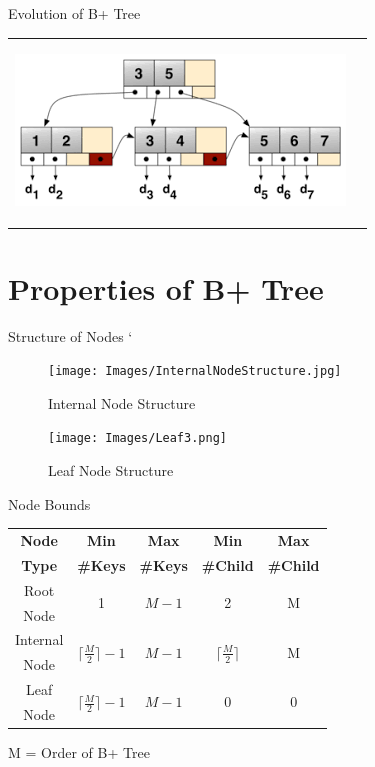 \documentclass{beamer}
\begin{document}
\begin{frame}{Evolution of B+ Tree}
\begin{table}[]
\begin{tabular}{c c}
\begin{overprint}
                \includegraphics[scale=0.7]{Images/b+tree1.png}
            \end{overprint}
        \end{tabular}
    \end{table}
\end{frame}
\section{Properties of B+ Tree}
\begin{frame}{Structure of Nodes}
`   \begin{figure}
        \texttt{[image: Images/InternalNodeStructure.jpg]}
        \caption{Internal Node Structure}
    \end{figure}
    \begin{figure}
        \texttt{[image: Images/Leaf3.png]}
        \caption{Leaf Node Structure}
    \end{figure} 
\end{frame}

\begin{frame}{Node Bounds} 
    \begin{table}[h]
        \centering
        \begin{tabular}{| c | c | c | c | c |}
            \hline
              \textbf{Node} & \textbf{Min} & \textbf{Max} & \textbf{Min} & \textbf{Max}\\
              \textbf{Type} &\textbf{\#Keys}&\textbf{\#Keys}& \textbf{\#Child}&\textbf{\#Child}\\
              \hline
              
              Root & \multirow{2}{*}{1}&\multirow{2}{*}{$M-1$}&\multirow{2}{*}{2\cite{navathe2010fundamentals}}&\multirow{2}{*}{M}\\
              Node & & & & \\
              \hline
               Internal& \multirow{2}{*}{$\lceil{\frac{M}{2}}\rceil - 1$ }&\multirow{2}{*}{$M-1$} &  \multirow{2}{*}{$\lceil{\frac{M}{2}}\rceil $ } & \multirow{2}{*}{M}\\
               Node& & & & \\
             \hline
             Leaf & \multirow{2}{*}{$\lceil{\frac{M}{2}}\rceil - 1 $ }&\multirow{2}{*}{$M-1$} & \multirow{2}{*}{0} & \multirow{2}{*}{0}\\
               Node& & & & \\
             \hline

        \end{tabular}
    \end{table}
           M = Order of B+ Tree
\end{frame}
\end{document}

